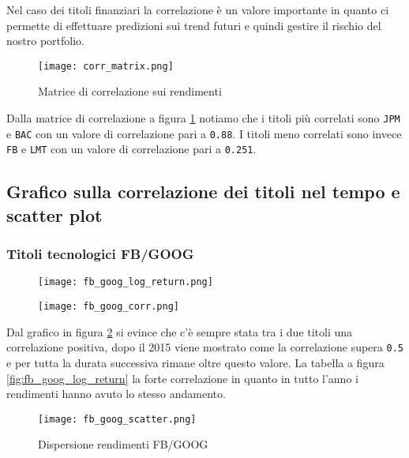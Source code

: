 Nel caso dei titoli finanziari la correlazione è un valore importante in quanto ci permette di effettuare predizioni sui trend futuri e quindi gestire il rischio del nostro
portfolio.

\begin{figure}[h]
  \centering
  \texttt{[image: corr\_matrix.png]}
  \caption{Matrice di correlazione sui rendimenti}
  \label{fig:corr_matrix}
\end{figure}

Dalla matrice di correlazione a figura \ref{fig:corr_matrix} notiamo che i titoli più correlati sono \verb|JPM| e \verb|BAC| con un valore di correlazione pari a
\verb|0.88|. I titoli meno correlati sono invece \verb|FB| e \verb|LMT| con un valore di correlazione pari a \verb|0.251|.

\subsection{Grafico sulla correlazione dei titoli nel tempo e scatter plot}

\subsubsection{Titoli tecnologici FB/GOOG}

\begin{figure}[h]
  \centering
  \begin{minipage}{.4\textwidth}
    \centering
    \texttt{[image: fb\_goog\_log\_return.png]}
    \label{fig:fb_goog_log_return}
  \end{minipage}%
  \begin{minipage}{.6\textwidth}
    \centering
    \texttt{[image: fb\_goog\_corr.png]}
    \label{fig:fb_goog_corr}
  \end{minipage}
\end{figure}

Dal grafico in figura \ref{fig:fb_goog_corr} si evince che c'è sempre stata tra i due titoli una correlazione positiva, dopo
il 2015 viene mostrato come la correlazione supera \verb|0.5| e per tutta la durata successiva rimane oltre questo valore.
La tabella a figura \ref{fig:fb_goog_log_return} la forte correlazione in quanto in tutto l'anno i rendimenti hanno avuto lo stesso andamento.

\begin{figure}[h]
  \centering
  \texttt{[image: fb\_goog\_scatter.png]}
  \caption{Dispersione rendimenti FB/GOOG}
  \label{fig:fb_goog_disp}
\end{figure}

